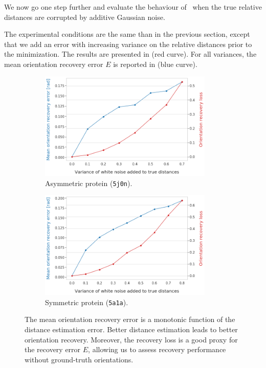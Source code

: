 
We now go one step further and evaluate the behaviour of~ when the true relative distances are corrupted by additive Gaussian noise.

The experimental conditions are the same than in the previous section, except that we add an error with increasing variance on the relative distances prior to the minimization.
The results are presented in  (red curve).
For all variances, the mean orientation recovery error $E$ is reported in  (blue curve).


\begin{figure}[b]
    \centering
    \begin{subfigure}[b]{0.48\textwidth}
        \includegraphics[height=5.15cm]{images/5j0n_perfect_noisy_ar_aa.png}
        \caption{Asymmetric protein (\texttt{5j0n}).}
    \end{subfigure}
    \hfill
    \begin{subfigure}[b]{0.50\textwidth}
    \centering
        \includegraphics[height=5.15cm]{images/5a1a_perfect_noisy_ar_aa.png}
        \caption{Symmetric protein (\texttt{5a1a}).}
    \end{subfigure}
    \caption{
    The mean orientation recovery error  is a monotonic function of the distance estimation error.
        Better distance estimation leads to better orientation recovery.
        Moreover, the recovery loss  is a good proxy for the recovery error $E$, allowing us to assess recovery performance without ground-truth orientations.
}
    \label{fig:perfect-with-noise-ar-aa}
\end{figure}


